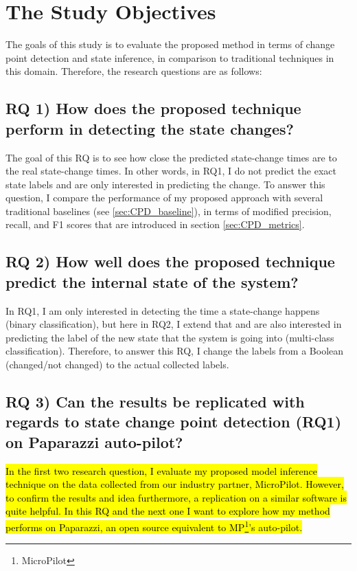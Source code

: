 \section{The Study Objectives}
The goals of this study is to evaluate the proposed method in terms of change point detection and state inference, in comparison to traditional techniques in this domain. Therefore, the research questions are as follows:

\subsection{RQ 1) How does the proposed technique perform in detecting the state changes?}
The goal of this RQ is to see how close the predicted state-change times are to the real state-change times. In other words, in RQ1, I do not predict the exact state labels and are only interested in predicting the change.
To answer this question, I compare the performance of my proposed approach with several traditional baselines (see \ref{sec:CPD_baseline}), in terms of modified precision, recall, and F1 scores that are introduced in section \ref{sec:CPD_metrics}.


\subsection{RQ 2) How well does the proposed technique predict the internal state of the system?}
In RQ1, I am only interested in detecting the time a state-change happens (binary classification), but here in RQ2, I extend that and are also interested in predicting the label of the new state that the system is going into (multi-class classification).
Therefore, to answer this RQ, I change the labels from a Boolean (changed/not changed) to the actual collected labels. 

\subsection{RQ 3) Can the results be replicated with regards to state change point detection (RQ1) on Paparazzi auto-pilot?}
\hl{In the first two research question, I evaluate my proposed model inference technique on the data collected from our industry partner, MicroPilot. However, to confirm the results and idea furthermore, a replication on a similar software is quite helpful. 
In this RQ and the next one I want to explore how my method performs on Paparazzi, an open source equivalent to MP\footnote{MicroPilot}'s auto-pilot.}

